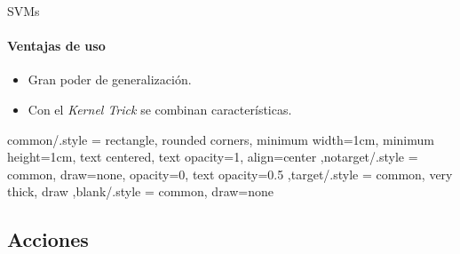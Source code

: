 \documentclass[utf8,draft]{beamer}
\begin{document}
  \begin{frame}{SVMs}
    \framesubtitle{Ventajas de uso}
    \begin{itemize}
    \item Gran poder de generalización.
    \item Con el \emph{Kernel Trick} se combinan características.
    \end{itemize}
  \end{frame}
  
\tikzset
  {common/.style =
    {rectangle, rounded corners, minimum width=1cm, minimum height=1cm,
     text centered, text opacity=1, align=center
    }
  ,notarget/.style = {common, draw=none, opacity=0, text opacity=0.5}
  ,target/.style   = {common, very thick, draw}
  ,blank/.style    = {common, draw=none}
  }

  \subsection*{Acciones}
  
\end{document}
